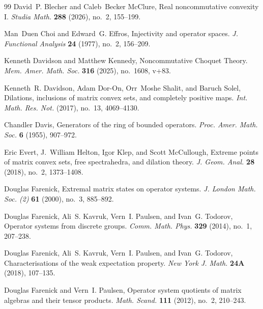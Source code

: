 \documentclass{amsart}
\theoremstyle{definition}
\theoremstyle{remark}
\numberwithin{equation}{section}
\begin{document}
\begin{thebibliography}{99}
David~P. Blecher and Caleb~Becker McClure,  Real noncommutative convexity
  {I}. \emph{Studia Math.} \textbf{288} (2026), no.~2, 155--199. %

Man~Duen Choi and Edward~G. Effros,  Injectivity and operator spaces. \emph{J.
  Functional Analysis} \textbf{24} (1977), no.~2, 156--209. %

Kenneth Davidson and Matthew Kennedy, Noncommutative {C}hoquet {T}heory.
\emph{Mem. Amer. Math. Soc.} \textbf{316} (2025), no.~1608, v+83. %

Kenneth~R. Davidson, Adam Dor-On, Orr~Moshe Shalit, and Baruch Solel,
Dilations, inclusions of matrix convex sets, and completely positive
  maps. \emph{Int. Math. Res. Not.} (2017), no.~13, 4069--4130. %

Chandler Davis,  Generators of the ring of bounded operators. \emph{Proc. Amer.
  Math. Soc.} \textbf{6} (1955), 907--972. %

Eric Evert, J.~William Helton, Igor Klep, and Scott McCullough,  Extreme
  points of matrix convex sets, free spectrahedra, and dilation theory. \emph{J.
  Geom. Anal.} \textbf{28} (2018), no.~2, 1373--1408. %

Douglas Farenick, Extremal matrix states on operator systems. \emph{J. London
  Math. Soc. (2)}  \textbf{61} (2000), no.~3, 885--892. %

Douglas Farenick, Ali~S. Kavruk, Vern~I. Paulsen, and Ivan~G. Todorov,
Operator systems from discrete groups. \emph{Comm. Math. Phys.} \textbf{329}
  (2014), no.~1, 207--238. %

Douglas Farenick, Ali~S. Kavruk, Vern~I. Paulsen, and Ivan~G. Todorov, 
Characterisations of the weak expectation property. \emph{New York J.
  Math.} \textbf{24A} (2018), 107--135. %

Douglas Farenick and Vern~I. Paulsen,  Operator system quotients of matrix
  algebras and their tensor products. \emph{Math. Scand.} \textbf{111} (2012), no.~2,
  210--243. %


\end{thebibliography}
\end{document}
